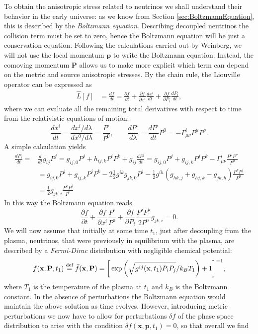 To obtain the anisotropic stress related to neutrinos we shall understand their behavior in the early universe: as we know from Section \ref{sec:BoltzmannEquation}, this is described by the \emph{Boltzmann equation}. Describing decoupled neutrinos the collision term must be set to zero, hence the Boltzmann equation will be just a conservation equation. Following the calculations carried out by Weinberg, we will not use the local momentum $\mathbf{p}$ to write the Boltzmann equation. Instead, the comoving momentum $\mathbf{P}$ allows us to make more explicit which term can depend on the metric and source anisotropic stresses. By the chain rule, the Liouville operator can be expressed as
\begin{align*}
    \hat L[f]&=\frac{df}{dt}= \frac{\partial f}{\partial t}+\frac{\partial f}{\partial x^i}\frac{dx^i}{dt}+\frac{\partial f}{\partial P_i}\frac{dP_i}{dt},
\end{align*}
where we can evaluate all the remaining total derivatives with respect to time from the relativistic equations of motion:
$$\frac{dx^i}{dt}=\frac{dx^i/d\lambda}{dx^0/d\lambda}=\frac{P^i}{P^0},\qquad \frac{dP^i}{d\lambda}=\frac{dP^i}{dt}P^0=-\Gamma^i_{\mu\nu} P^\mu P^\nu.$$
A simple calculation yields
\begin{align*}
        \frac{dP_i}{dt}=&\frac{d}{dt}g_{ij}P^j=g_{ij,0}P^j+h_{ij,k}P^iP^k+g_{ij}\frac{dP^j}{dt}=g_{ij,0}P^j+g_{ij,k}P^jP^k-\Gamma^{i}_{\mu\nu}\frac{P^\mu P^\nu}{P^0}\\
        &=g_{ij,0}P^j+g_{ij,k}P^jP^k-2\frac{1}{2}g^{ik}g_{jk,0}P^j-\frac{1}{2}g^{ih}(g_{hk,j}+g_{hj,k}-g_{jk,h})\frac{P^kP^j}{P^0}\\
        &=\frac{1}{2}g_{jk,i}\frac{P^kP^j}{P^0}
\end{align*}
In this way the Boltzmann equation reads
\begin{equation}
    \frac{\partial f}{\partial t}+\frac{\partial f}{\partial x^i}\frac{P^i}{P^0}+\frac{\partial f}{\partial P_i}\frac{P^jP^k}{2P^0}g_{jk,i}=0. \label{eq:Boltzmann_neutrinos}
\end{equation}
We will now assume that initially at some time $t_1$, just after decoupling from the plasma, neutrinos, that were previously in equilibrium with the plasma, are described by a \emph{Fermi-Dirac} distribution with negligible chemical potential:
$$f(\mathbf{x},\mathbf{P},t_1)\stackrel{\text{def}}{=}\bar f(\mathbf{x},\mathbf{P})=\bigg[\exp\bigg(\sqrt{g^{ij}(\mathbf x,t_1)P_iP_j}/k_B T_1\bigg)+1\bigg]^{-1},$$
where $T_1$ is the temperature of the plasma at $t_1$ and $k_B$ is the Boltzmann constant. In the absence of perturbations the Boltzmann equation would maintain the above solution as time evolves. However, introducing metric perturbations we now have to allow for perturbations $\delta f$ of the phase space distribution to arise with the condition $\delta f(\mathbf x,\mathbf p, t_1)=0$, so that overall we find
